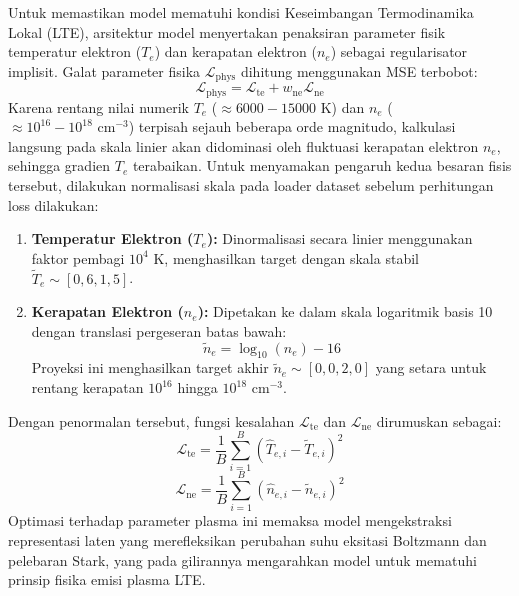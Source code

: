 Untuk memastikan model mematuhi kondisi Keseimbangan Termodinamika Lokal (LTE), arsitektur model menyertakan penaksiran parameter fisik temperatur elektron ($T_e$) dan kerapatan elektron ($n_e$) sebagai regularisator implisit. Galat parameter fisika $\mathcal{L}_{\mathrm{phys}}$ dihitung menggunakan MSE terbobot:
\begin{equation}
\mathcal{L}_{\mathrm{phys}} = \mathcal{L}_{\mathrm{te}} + w_{\mathrm{ne}} \mathcal{L}_{\mathrm{ne}}
\end{equation}
Karena rentang nilai numerik $T_e$ ($\approx 6000 - 15000 \text{ K}$) dan $n_e$ ($\approx 10^{16} - 10^{18} \text{ cm}^{-3}$) terpisah sejauh beberapa orde magnitudo, kalkulasi langsung pada skala linier akan didominasi oleh fluktuasi kerapatan elektron $n_e$, sehingga gradien $T_e$ terabaikan. Untuk menyamakan pengaruh kedua besaran fisis tersebut, dilakukan normalisasi skala pada loader dataset sebelum perhitungan loss dilakukan:
\begin{enumerate}
\item \textbf{Temperatur Elektron ($T_e$):} Dinormalisasi secara linier menggunakan faktor pembagi $10^4 \text{ K}$, menghasilkan target dengan skala stabil $\tilde{T}_e \sim [0{,}6, 1{,}5]$.
\item \textbf{Kerapatan Elektron ($n_e$):} Dipetakan ke dalam skala logaritmik basis 10 dengan translasi pergeseran batas bawah:
   \begin{equation}
   \tilde{n}_e = \log_{10}(n_e) - 16
   \end{equation}
   Proyeksi ini menghasilkan target akhir $\tilde{n}_e \sim [0{,}0, 2{,}0]$ yang setara untuk rentang kerapatan $10^{16}$ hingga $10^{18} \text{ cm}^{-3}$.
\end{enumerate}
Dengan penormalan tersebut, fungsi kesalahan $\mathcal{L}_{\mathrm{te}}$ dan $\mathcal{L}_{\mathrm{ne}}$ dirumuskan sebagai:
\begin{equation}
\mathcal{L}_{\mathrm{te}} = \frac{1}{B} \sum_{i=1}^{B} \left( \hat{T}_{e, i} - \tilde{T}_{e, i} \right)^2
\end{equation}
\begin{equation}
\mathcal{L}_{\mathrm{ne}} = \frac{1}{B} \sum_{i=1}^{B} \left( \hat{n}_{e, i} - \tilde{n}_{e, i} \right)^2
\end{equation}
Optimasi terhadap parameter plasma ini memaksa model mengekstraksi representasi laten yang merefleksikan perubahan suhu eksitasi Boltzmann dan pelebaran Stark, yang pada gilirannya mengarahkan model untuk mematuhi prinsip fisika emisi plasma LTE.

